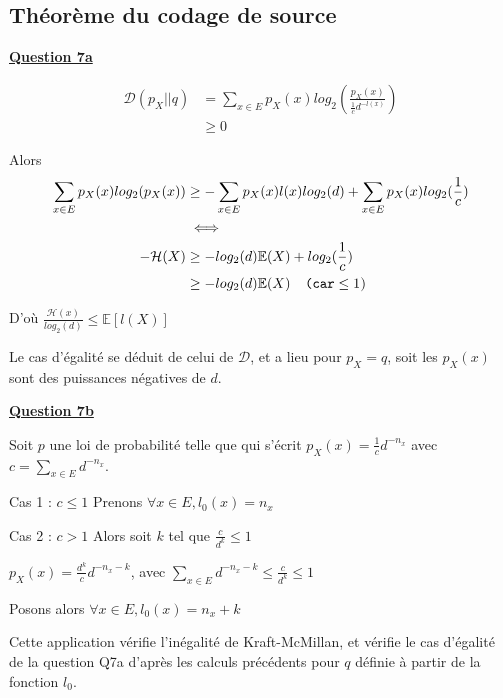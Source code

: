 \documentclass[a4paper,twoside,10pt]{article}
\renewcommand{\H}{\mathcal{H}}
\newcommand{\D}{\mathcal{D}}
\newenvironment{Q}[1]{%
\vspace{1ex}
\underline{\textbf{Question #1\\}}
\newline
}{
\vspace{2ex}
}
\begin{document}
\subsection{Théorème du codage de source}

\begin{Q}{7a}

\begin{align*}
\D(p_X||q) &= \sum_{x \in E}p_X(x)log_2(\frac{p_X(x)}{\frac{1}{c}d^{-l(x)}}) \\
&\geq 0
\end{align*}

Alors
\begin{align*}
\sum_{x \in E}p_X(x)log_2(p_X(x)) &\geq  -\sum_{x \in E}p_X(x)l(x)log_2(d) + \sum_{x \in E}p_X(x)log_2(\frac{1}{c}) \\
 &\iff\\
-\H(X) &\geq -log_2(d) \mathbb{E}(X) + log_2(\frac{1}{c})
\\ &\geq -log_2(d) \mathbb{E}(X) \texttt{\quad(car} \leq 1 \textsc{)}
\end{align*}

D'où $\frac{\H(x)}{log_2(d)} \leq \mathbb{E}[l(X)]$
 
Le cas d'égalité se déduit de celui de $\D$, et a lieu pour $p_X = q$, soit les $p_X(x)$ sont des puissances négatives de $d$.
\end{Q}

\begin{Q}{7b}
Soit $p$ une loi de probabilité telle que qui s'écrit $p_X(x) = \frac{1}{c}d^{-n_x}$ avec $c = \sum_{x \in E} d^{-n_x}$.

Cas 1 : $c \leq 1$ Prenons $\forall x \in E, l_0(x) = n_x$

Cas 2 : $c > 1$ Alors soit $k$ tel que $\frac{c}{d^k} \leq 1$

$p_X(x) = \frac{d^k}{c}d^{-n_x - k}$, avec $\sum_{x \in E} d^{-n_x - k} \leq \frac{c}{d^k} \leq 1$

Posons alors $\forall x \in E, l_0(x) = n_x + k$

Cette application vérifie l'inégalité de Kraft-McMillan, et vérifie le cas d'égalité de la question Q7a d'après les calculs
précédents pour $q$ définie à partir de la fonction $l_0$.
\end{Q}
\end{document}
